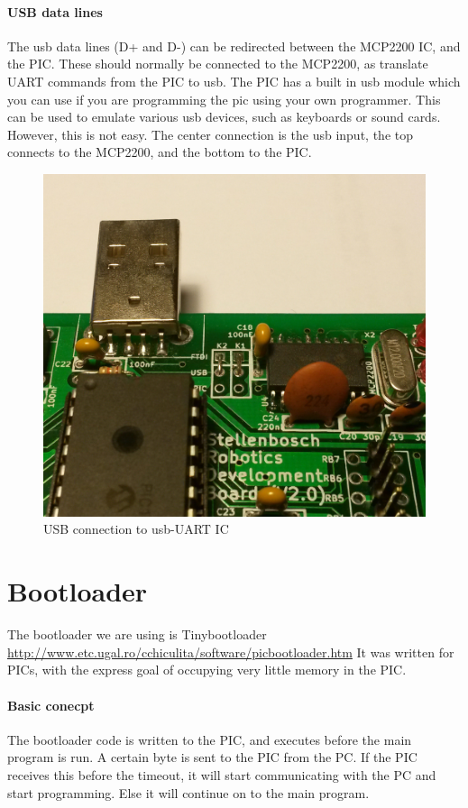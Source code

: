 \documentclass{article}
\begin{document}
\paragraph{USB data lines}
The usb data lines (D+ and D-) can be redirected between the MCP2200 IC, and the PIC. These should normally be connected to the MCP2200, as translate UART commands from the PIC to usb. The PIC has a built in usb module which you can use if you are programming the pic using your own programmer. This can be used to emulate various usb devices, such as keyboards or sound cards. However, this is not easy. The center connection is the usb input, the top connects to the MCP2200, and the bottom to the PIC.
\begin{figure}[h!]
	\centering
    \includegraphics[scale=0.25]{usb_jumpers.jpg}
    \caption {USB connection to usb-UART IC}
\end{figure}

\section {Bootloader}
The bootloader we are using is Tinybootloader \url{http://www.etc.ugal.ro/cchiculita/software/picbootloader.htm} It was written for PICs, with the express goal of occupying very little memory in the PIC.
\paragraph{Basic conecpt}
The bootloader code is written to the PIC, and executes before the main program is run. A certain byte is sent to the PIC from the PC. If the PIC receives this before the timeout, it will start communicating with the PC and start programming. Else it will continue on to the main program.
\end{document}
